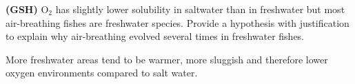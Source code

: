 \documentclass[11pt, addpoints]{exam}
\begin{document}
\begin{questions}
\newpage

%
%

\noaddpoints
\question[5]
\textbf{(GSH)} O$_2$ has slightly lower solubility in saltwater than in freshwater but most air-breathing fishes are freshwater species.  Provide a hypothesis with justification to explain why air-breathing evolved several times in freshwater fishes.

\begin{solution}
  More freshwater areas tend to be warmer, more sluggish and therefore lower oxygen environments compared to salt water.
\end{solution}
\addpoints
{}

\end{questions}
\end{document}

